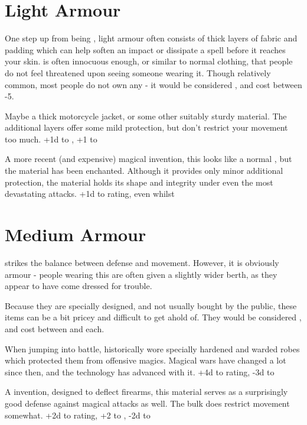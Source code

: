 \section{Light Armour}

One step up from being , light armour often consists of thick layers of fabric and padding which can help soften an impact or dissipate a spell before it reaches your skin.  is often innocuous enough, or similar to normal clothing, that people do not feel threatened upon seeing someone wearing it. Though relatively common, most people do not own any  - it would be considered , and cost between -5.

{
	Maybe a thick motorcycle jacket, or some other suitably sturdy material. The additional layers offer some mild protection, but don't restrict your movement too much.
}
{
	+1d to , +1 to 
}

{
	A more recent (and expensive) magical invention, this looks like a normal , but the material has been enchanted. Although it provides only minor additional protection, the material holds its shape and integrity under even the most devastating attacks.
}
{
	+1d to  rating, even whilst 
}


\section{Medium Armour}

 strikes the balance between defense and movement. However, it is obviously armour - people wearing this are often given a slightly wider berth, as they appear to have come dressed for trouble.

Because they are specially designed, and not usually bought by the public, these items can be a bit pricey and difficult to get ahold of. They would be considered , and cost between  and  each.

{
	When jumping into battle,  historically wore specially hardened and warded robes which protected them from offensive magics. Magical wars have changed a lot since then, and the technology has advanced with it. 
}
{	
	+4d to  rating, -3d to 
}

{
	A  invention, designed to deflect firearms, this material serves as a surprisingly good defense against magical attacks as well. The bulk does restrict movement somewhat.
}
{
	+2d to  rating, +2 to , -2d to 
}

